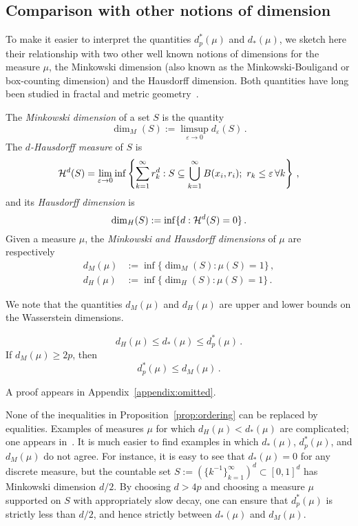 \documentclass[sts]{imsart}
\newcommand*{\ep}{\varepsilon}
\begin{document}
\subsection{Comparison with other notions of dimension}\label{subsec:other_dimensions}
To make it easier to interpret the quantities $d_p^*(\mu)$ and $d_*(\mu)$, we sketch here their relationship with two other well known notions of dimensions for the measure $\mu$, the Minkowski dimension (also known as the Minkowski-Bouligand or box-counting dimension) and the Hausdorff dimension.
Both quantities have long been studied in fractal and metric geometry~\cite{falconer2004fractal}.
\begin{definition}
The \emph{Minkowski dimension} of a set $S$ is the quantity
\begin{equation*}
\dim_M(S) := \limsup_{\ep \to 0} d_\ep(S)\,.
\end{equation*}
The \emph{$d$-Hausdorff measure} of $S$ is
\begin{equation*}
\cH^d(S) = \lim_{\ep \to 0} \inf\left\{\sum_{k=1}^\infty r_k^d: S \subseteq \bigcup_{k=1}^\infty B(x_i, r_i); \,\,r_k \leq \ep \, \forall k\right\}\,,
\end{equation*}
and its \emph{Hausdorff dimension} is
\begin{equation*}
\dim_H(S) := \inf \{d: \mathcal{H}^d(S) = 0\}\,.
\end{equation*}
Given a measure $\mu$, the \emph{Minkowski and Hausdorff dimensions} of $\mu$ are respectively
\begin{align*}
d_M(\mu) &:= \inf \{\dim_M(S): \mu(S) = 1\}\,, \\
d_H(\mu) &:= \inf \{\dim_H(S): \mu(S) = 1\}\,.
\end{align*}
\end{definition}

We note that the quantities $d_M(\mu)$ and $d_H(\mu)$ are upper and lower bounds on the Wasserstein dimensions.
\begin{proposition}\label{prop:ordering}
\begin{equation*}
d_H(\mu) \leq d_*(\mu) \leq d_p^*(\mu)\,.
\end{equation*}
If $d_M(\mu) \geq 2p$, then
\begin{equation*}
d^*_p(\mu) \leq d_M(\mu)\,.
\end{equation*}
\end{proposition}
A proof appears in Appendix~\ref{appendix:omitted}.

None of the inequalities in Proposition~\ref{prop:ordering} can be replaced by equalities.
Examples of measures $\mu$ for which $d_H(\mu) < d_*(\mu)$ are complicated; one appears in~\cite[Remark~7.8]{KaiPri11}.
It is much easier to find examples in which $d_*(\mu)$, $d^*_p(\mu)$, and $d_M(\mu)$ do not agree.
For instance, it is easy to see that $d_*(\mu) = 0$ for any discrete measure, but the countable set $S := \left(\{k^{-1}\}_{k=1}^\infty\right)^d \subset [0, 1]^d$ has Minkowski dimension $d/2$.
By choosing $d > 4p$ and choosing a measure $\mu$ supported on $S$ with appropriately slow decay, one can ensure that $d^*_p(\mu)$ is strictly less than $d/2$, and hence strictly between $d_*(\mu)$ and $d_M(\mu)$.
\end{document}
